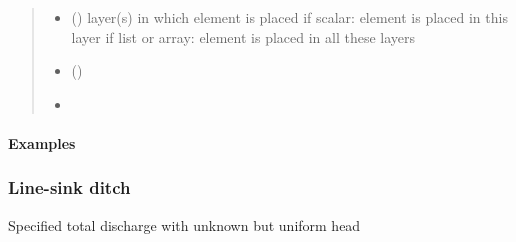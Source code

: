 \documentclass[letterpaper,10pt,english]{sphinxmanual}
\begin{document}
\begin{fulllineitems}
\begin{quote}
\begin{description}
\begin{itemize}
\item {} 
 (\sphinxstyleliteralemphasis{, }) \textendash{} layer(s) in which element is placed
if scalar: element is placed in this layer
if list or array: element is placed in all these layers

\item {} 
 () \textendash{} 

\item {} 
\sphinxstyleliteralstrong{-{-}-{-}-} \textendash{} 

\end{itemize}

\end{description}\end{quote}
\paragraph{Examples}

\begin{sphinxVerbatim}[commandchars=\\\{\}]
  \PYG{p}{[} \PYG{p}{]} \PYG{p}{[}   \PYG{p}{]} 
 \PYG{p}{[}     \PYG{p}{]} 
\end{sphinxVerbatim}

\end{fulllineitems}



\subsubsection{Line-sink ditch}
\label{\detokenize{linesinks/linesinkditch::doc}}\label{\detokenize{linesinks/linesinkditch:line-sink-ditch}}
Specified total discharge with unknown but uniform head
\end{document}
